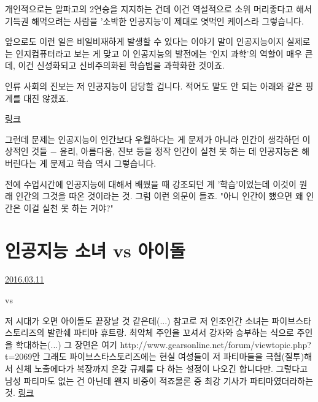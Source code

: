 개인적으로는 알파고의 2연승을 지지하는 건데
이건 역설적으로 소위 머리좋다고 해서 기득권 해먹으려는 사람을
'소박한 인공지능'이 제대로 엿먹인 케이스라 그렇습니다.
\vspace{5mm}

앞으로도 이런 일은 비일비재하게 발생할 수 있다는 이야기
말이 인공지능이지 실제로는 인지컴퓨터라고 보는 게 맞고
이 인공지능의 발전에는 '인지 과학'의 역할이 매우 큰데,
이건 신성화되고 신비주의화된 학습법을 과학화한 것이죠.
\vspace{5mm}

인류 사회의 진보는 저 인공지능이 담당할 겁니다.
적어도 말도 안 되는 아래와 같은 핑계를 대진 않겠죠.
\vspace{5mm}

\href{http://news.chosun.com/site/data/html_dir/2016/03/11/2016031101156.html}{링크}
\vspace{5mm}

그런데 문제는 인공지능이 인간보다 우월하다는 게 문제가 아니라
인간이 생각하던 이상적인 것들 $-$ 윤리, 아름다움, 진보 등을 정작 인간이 실천 못 하는 데 인공지능은 해버린다는 게 문제고
학습 역시 그렇습니다.
\vspace{5mm}

전에 수업시간에 인공지능에 대해서 배웠을 때 강조되던 게 '학습'이었는데 이것이 원래 인간의 그것을 따온 것이라는 것.
그럼 이런 의문이 들죠. "아니 인간이 했으면 왜 인간은 이걸 실천 못 하는 거야?"
\vspace{5mm}






\section{인공지능 소녀 vs 아이돌}
\href{https://www.kockoc.com/Apoc/672940}{2016.03.11}

\vspace{5mm}

vs
\vspace{5mm}

저 시대가 오면 아이돌도 끝장날 것 같은데(...) 참고로 저 인조인간 소녀는 파이브스타스토리즈의 발란쉐 파티마 휴트랑.
 최약체 주인을 꼬셔서 강자와 승부하는 식으로 주인을 학대하는(...) 
 그 장면은 여기 http://www.gearsonline.net/forum/viewtopic.php?t=2069안 그래도 파이브스타스토리즈에는 
 현실 여성들이 저 파티마들을 극혐(질투)해서 신체 노출에다가 복장까지 온갖 규제를 다 하는 설정이 나오긴 합니다만.
 그렇다고 남성 파티마도 없는 건 아닌데 왠지 비중이 적죠물론 중 최강 기사가 파티마였더라하는 것.
 \href{https://namu.wiki/w/%ED%8C%8C%EC%9D%B4%EB%B8%8C%20%EC%8A%A4%ED%83%80%20%EC%8A%A4%ED%86%A0%EB%A6%AC}{링크}
 
